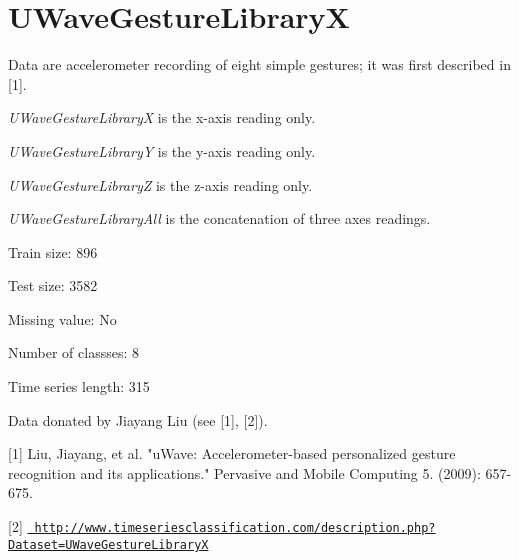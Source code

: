 \chapter{UWave\+Gesture\+LibraryX}
\hypertarget{md_external_2data_2UCRArchive__2018_2UWaveGestureLibraryX_2README}{}\label{md_external_2data_2UCRArchive__2018_2UWaveGestureLibraryX_2README}
\label{md_external_2data_2UCRArchive__2018_2UWaveGestureLibraryX_2README_autotoc_md226}%
%
 Data are accelerometer recording of eight simple gestures; it was first described in \mbox{[}1\mbox{]}.

{\itshape UWave\+Gesture\+LibraryX} is the x-\/axis reading only.

{\itshape UWave\+Gesture\+LibraryY} is the y-\/axis reading only.

{\itshape UWave\+Gesture\+LibraryZ} is the z-\/axis reading only.

{\itshape UWave\+Gesture\+Library\+All} is the concatenation of three axes readings.

Train size\+: 896

Test size\+: 3582

Missing value\+: No

Number of classses\+: 8

Time series length\+: 315

Data donated by Jiayang Liu (see \mbox{[}1\mbox{]}, \mbox{[}2\mbox{]}).

\mbox{[}1\mbox{]} Liu, Jiayang, et al. "{}u\+Wave\+: Accelerometer-\/based personalized gesture recognition and its applications."{} Pervasive and Mobile Computing 5. (2009)\+: 657-\/675.

\mbox{[}2\mbox{]} \href{http://www.timeseriesclassification.com/description.php?Dataset=UWaveGestureLibraryX}{\texttt{ http\+://www.\+timeseriesclassification.\+com/description.\+php?\+Dataset=\+UWave\+Gesture\+LibraryX}} 